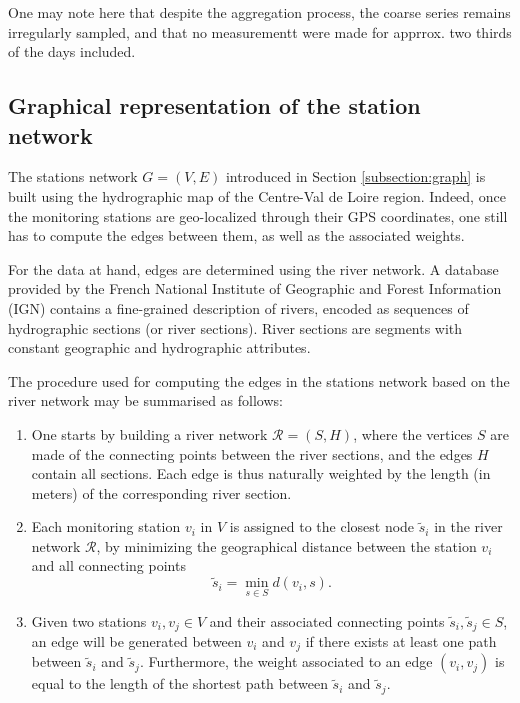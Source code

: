 One may note here that despite the aggregation process, the coarse series remains irregularly sampled, and that no measurementt were made for apprrox. two thirds of the days included. 

\subsection{Graphical representation of the station network}\label{subsection:graph:construct}

The stations network $G=(V,E)$ introduced in Section \ref{subsection:graph} is built using the hydrographic map of the Centre-Val de Loire region. Indeed, once the monitoring stations are geo-localized through their GPS coordinates, one still has to compute the edges between them, as well as the associated weights. 

For the data at hand, edges are determined using the river network. A database provided by the French National Institute of Geographic and Forest Information (IGN) \cite{IGN:BD:TOPO} contains a fine-grained description of rivers, encoded as sequences of hydrographic sections (or river sections). River sections are segments with constant geographic and hydrographic attributes. 

The procedure used for computing the edges in the stations network based on the river network may be summarised as follows:



\begin{enumerate}
    \item One starts by building a river network $\mathcal{R}=(S,H)$, where the vertices $S$ are made of the connecting points between the river sections, and the edges $H$ contain all sections. Each edge is thus naturally weighted by the length (in meters) of the corresponding river section. 
    \item Each monitoring station $v_i$ in $V$ is assigned to the closest node $\tilde s_i$ in the river network $\mathcal{R}$, by minimizing the geographical distance between the station $v_i$ and all connecting points
    \begin{equation*}
     \tilde s_i=\min_{s\in S} d(v_i, s).
    \end{equation*}
    \item Given two stations $v_i,v_j \in V$ and their associated connecting points $\tilde s_i,\tilde s_j \in S$, an edge will be generated between $v_i$ and $v_j$ if there exists at least one path between $\tilde s_i$ and $\tilde s_j$. Furthermore, the weight associated to an edge $(v_i,v_j)$ is equal to the length of the shortest path between $\tilde s_i$ and $\tilde s_j$.
\end{enumerate}

